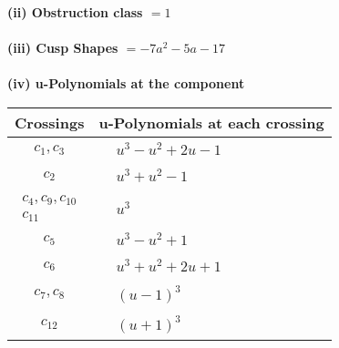 \documentclass[1p]{elsarticle_modified}
\theoremstyle{definition}
\begin{document}
\flushleft \textbf{(ii) Obstruction class $= 1$}\\~\\
\flushleft \textbf{(iii) Cusp Shapes $= -7 a^2-5 a-17$}\\~\\
\newpage\renewcommand{\arraystretch}{1}
\flushleft \textbf{(iv) u-Polynomials at the component}\newline \\
\begin{tabular}{m{50pt}|m{274pt}}
Crossings & \hspace{64pt}u-Polynomials at each crossing \\
\hline $$\begin{aligned}c_{1},c_{3}\end{aligned}$$&$\begin{aligned}
&u^3- u^2+2 u-1
\end{aligned}$\\
\hline $$\begin{aligned}c_{2}\end{aligned}$$&$\begin{aligned}
&u^3+u^2-1
\end{aligned}$\\
\hline $$\begin{aligned}c_{4},c_{9},c_{10}\\c_{11}\end{aligned}$$&$\begin{aligned}
&u^3
\end{aligned}$\\
\hline $$\begin{aligned}c_{5}\end{aligned}$$&$\begin{aligned}
&u^3- u^2+1
\end{aligned}$\\
\hline $$\begin{aligned}c_{6}\end{aligned}$$&$\begin{aligned}
&u^3+u^2+2 u+1
\end{aligned}$\\
\hline $$\begin{aligned}c_{7},c_{8}\end{aligned}$$&$\begin{aligned}
&(u-1)^3
\end{aligned}$\\
\hline $$\begin{aligned}c_{12}\end{aligned}$$&$\begin{aligned}
&(u+1)^3
\end{aligned}$\\
\hline
\end{tabular}\\~\\
\end{document}
